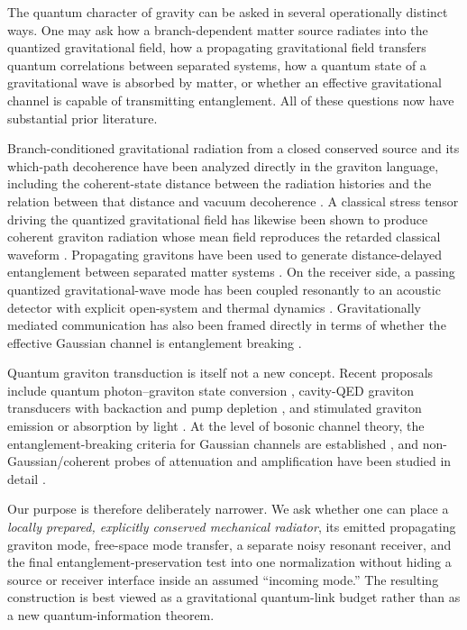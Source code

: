 \documentclass[11pt]{article}
\begin{document}
The quantum character of gravity can be asked in several operationally distinct ways. One may ask how a branch-dependent matter source radiates into the quantized gravitational field, how a propagating gravitational field transfers quantum correlations between separated systems, how a quantum state of a gravitational wave is absorbed by matter, or whether an effective gravitational channel is capable of transmitting entanglement. All of these questions now have substantial prior literature.

Branch-conditioned gravitational radiation from a closed conserved source and its which-path decoherence have been analyzed directly in the graviton language, including the coherent-state distance between the radiation histories and the relation between that distance and vacuum decoherence \cite{Matsui2026}. A classical stress tensor driving the quantized gravitational field has likewise been shown to produce coherent graviton radiation whose mean field reproduces the retarded classical waveform \cite{LagaSuyama2026}. Propagating gravitons have been used to generate distance-delayed entanglement between separated matter systems \cite{TrengganaZen2026}. On the receiver side, a passing quantized gravitational-wave mode has been coupled resonantly to an acoustic detector with explicit open-system and thermal dynamics \cite{ToccaceloEtAl2026}. Gravitationally mediated communication has also been framed directly in terms of whether the effective Gaussian channel is entanglement breaking \cite{MariEtAl2026,ToccaceloAndersenBrask2025,MikiLiChen2026}.

Quantum graviton transduction is itself not a new concept. Recent proposals include quantum photon--graviton state conversion \cite{IkedaEtAl2025}, cavity-QED graviton transducers with backaction and pump depletion \cite{AraniLamineSoda2026}, and stimulated graviton emission or absorption by light \cite{Schutzhold2025}. At the level of bosonic channel theory, the entanglement-breaking criteria for Gaussian channels are established \cite{Holevo2008EB}, and non-Gaussian/coherent probes of attenuation and amplification have been studied in detail \cite{FilippovZiman2014}.

Our purpose is therefore deliberately narrower. We ask whether one can place a \emph{locally prepared, explicitly conserved mechanical radiator}, its emitted propagating graviton mode, free-space mode transfer, a separate noisy resonant receiver, and the final entanglement-preservation test into one normalization without hiding a source or receiver interface inside an assumed ``incoming mode.'' The resulting construction is best viewed as a gravitational quantum-link budget rather than as a new quantum-information theorem.
\end{document}
